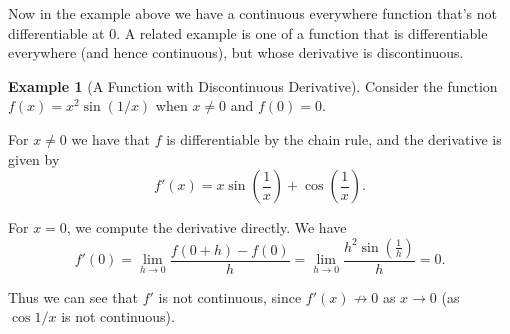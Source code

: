 \documentclass[11pt, a4paper]{article}
\theoremstyle{definition}
\newtheorem{example}[theorem]{Example}
\begin{document}
Now in the example above we have a continuous everywhere function that's not differentiable at $0$. A related example is one of a function that is differentiable everywhere (and hence continuous), but whose derivative is discontinuous.

\begin{example}[A Function with Discontinuous Derivative]
	Consider the function $f(x) = x^2 \sin(1/x)$ when $x \neq 0$ and $f(0) = 0$.

	For $x \neq 0$ we have that $f$ is differentiable by the chain rule, and the derivative is given by
	$$
	f'(x) = x\sin\left(\frac{1}{x}\right) + \cos\left(\frac{1}{x}\right).
	$$

	For $x = 0$, we compute the derivative directly. We have
	$$
	f'(0) = \lim_{h \to 0} \frac{f(0 + h) - f(0)}{h} = \lim_{h \to 0} \frac{h^2\sin\left(\frac{1}{h}\right)}{h} = 0.
	$$

	Thus we can see that $f'$ is not continuous, since $f'(x) \not \rightarrow 0$ as $x \rightarrow 0$ (as $\cos 1/x$ is not continuous).

	\begin{center}
	\end{center}
\end{example}
\end{document}
